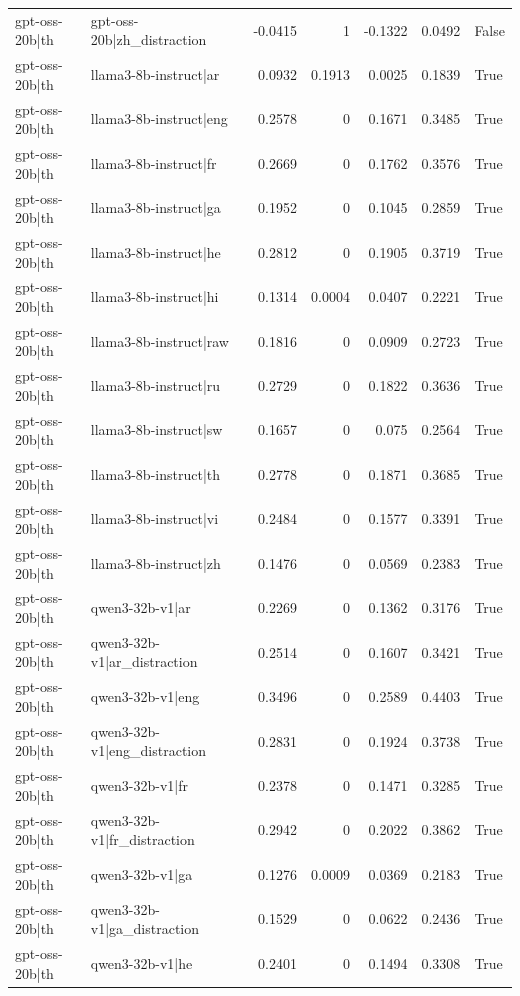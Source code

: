 \begin{table}
\begin{tabular}{l l r r r r l}
gpt-oss-20b|th & gpt-oss-20b|zh_distraction & -0.0415 & 1 & -0.1322 & 0.0492 & False \\
gpt-oss-20b|th & llama3-8b-instruct|ar & 0.0932 & 0.1913 & 0.0025 & 0.1839 & True \\
gpt-oss-20b|th & llama3-8b-instruct|eng & 0.2578 & 0 & 0.1671 & 0.3485 & True \\
gpt-oss-20b|th & llama3-8b-instruct|fr & 0.2669 & 0 & 0.1762 & 0.3576 & True \\
gpt-oss-20b|th & llama3-8b-instruct|ga & 0.1952 & 0 & 0.1045 & 0.2859 & True \\
gpt-oss-20b|th & llama3-8b-instruct|he & 0.2812 & 0 & 0.1905 & 0.3719 & True \\
gpt-oss-20b|th & llama3-8b-instruct|hi & 0.1314 & 0.0004 & 0.0407 & 0.2221 & True \\
gpt-oss-20b|th & llama3-8b-instruct|raw & 0.1816 & 0 & 0.0909 & 0.2723 & True \\
gpt-oss-20b|th & llama3-8b-instruct|ru & 0.2729 & 0 & 0.1822 & 0.3636 & True \\
gpt-oss-20b|th & llama3-8b-instruct|sw & 0.1657 & 0 & 0.075 & 0.2564 & True \\
gpt-oss-20b|th & llama3-8b-instruct|th & 0.2778 & 0 & 0.1871 & 0.3685 & True \\
gpt-oss-20b|th & llama3-8b-instruct|vi & 0.2484 & 0 & 0.1577 & 0.3391 & True \\
gpt-oss-20b|th & llama3-8b-instruct|zh & 0.1476 & 0 & 0.0569 & 0.2383 & True \\
gpt-oss-20b|th & qwen3-32b-v1|ar & 0.2269 & 0 & 0.1362 & 0.3176 & True \\
gpt-oss-20b|th & qwen3-32b-v1|ar_distraction & 0.2514 & 0 & 0.1607 & 0.3421 & True \\
gpt-oss-20b|th & qwen3-32b-v1|eng & 0.3496 & 0 & 0.2589 & 0.4403 & True \\
gpt-oss-20b|th & qwen3-32b-v1|eng_distraction & 0.2831 & 0 & 0.1924 & 0.3738 & True \\
gpt-oss-20b|th & qwen3-32b-v1|fr & 0.2378 & 0 & 0.1471 & 0.3285 & True \\
gpt-oss-20b|th & qwen3-32b-v1|fr_distraction & 0.2942 & 0 & 0.2022 & 0.3862 & True \\
gpt-oss-20b|th & qwen3-32b-v1|ga & 0.1276 & 0.0009 & 0.0369 & 0.2183 & True \\
gpt-oss-20b|th & qwen3-32b-v1|ga_distraction & 0.1529 & 0 & 0.0622 & 0.2436 & True \\
gpt-oss-20b|th & qwen3-32b-v1|he & 0.2401 & 0 & 0.1494 & 0.3308 & True \\

\end{tabular}
\end{table}
